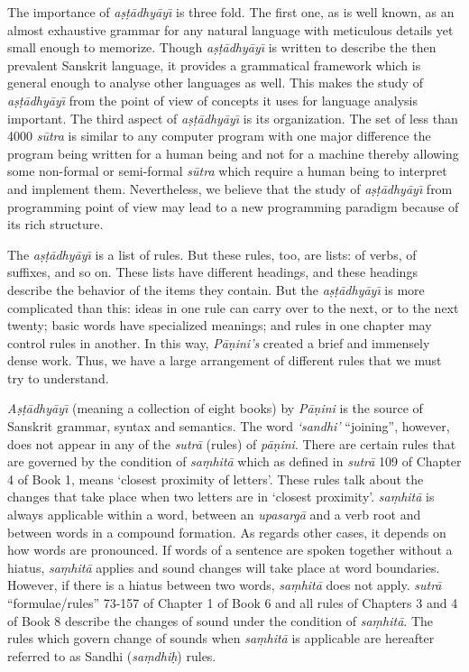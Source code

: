 \documentclass[11pt]{article}
\begin{document}
The importance of \textit{a\d{s}\d{t}\={a}dhy\={a}y\={\i}} is three fold. The first one, as is well known, as an almost exhaustive grammar for any natural language with meticulous details yet small enough to memorize. Though \textit{a\d{s}\d{t}\={a}dhy\={a}y\={\i}} is written to describe the then prevalent Sanskrit language, it provides a grammatical framework which is general enough to analyse other languages as well. This makes the study of \textit{a\d{s}\d{t}\={a}dhy\={a}y\={\i}} from the point of view of concepts it uses for language analysis important. The third aspect of \textit{a\d{s}\d{t}\={a}dhy\={a}y\={\i}} is its organization. The set of less than 4000 \textit{s\={u}tra} is similar to any computer program with one major difference the program being written for a human being and not for a machine thereby allowing some non-formal or semi-formal \textit{s\={u}tra} which require a human being to interpret and implement them. Nevertheless, we believe that the study of \textit{a\d{s}\d{t}\={a}dhy\={a}y\={\i}} from programming point of view may lead to a new programming paradigm because of its rich structure.

The \textit{a\d{s}\d{t}\={a}dhy\={a}y\={\i}} is a list of rules. But these rules, too, are lists: of verbs, of suffixes, and so on. These lists have different headings, and these headings describe the behavior of the items they contain. But the \textit{a\d{s}\d{t}\={a}dhy\={a}y\={\i}} is more complicated than this: ideas in one rule can carry over to the next, or to the next twenty; basic words have specialized meanings; and rules in one chapter may control rules in another. In this way, 	\textit{P\={a}\d{n}ini's} created a brief and immensely dense work. Thus, we have a large arrangement of different rules that we must try to understand.

\textit{A\d{s}\d{t}\={a}dhy\={a}y\={\i}} (meaning a collection of eight books) by \textit{P\={a}\d{n}ini} is the source of Sanskrit grammar, syntax and semantics. The word  \textit{‘sandhi’} ``joining'', however, does not appear in any of the \textit{sutr\={a}} (rules) of \textit{p\={a}\d{n}ini}. There are certain rules that are governed by the condition of  \textit{sa\d{m}hit\={a}} which as defined in \textit{sutr\={a}} 109 of Chapter 4 of Book 1, means ‘closest proximity of letters’. These rules talk about the changes that take place when two letters are in ‘closest proximity’.
\textit{sa\d{m}hit\={a}} is always applicable within a word, between an \textit{upasarg\={a}} and a verb root and between words in a compound formation. As regards other cases, it depends on how words are pronounced. If words of a sentence are spoken together without a hiatus,  \textit{sa\d{m}hit\={a}} applies and sound changes will take place at word boundaries. However, if there is a hiatus between two words, \textit{sa\d{m}hit\={a}} does not apply. 
 \textit{sutr\={a}} ``formulae/rules'' 73-157 of Chapter 1 of Book 6 and all rules of Chapters 3 and 4 of Book 8 describe the changes of sound under the condition of \textit{sa\d{m}hit\={a}}. The rules which govern change of sounds when \textit{sa\d{m}hit\={a}} is applicable are hereafter referred to as Sandhi (\textit{sa\d{m}dhi\d{h}}) rules.
\end{document}
